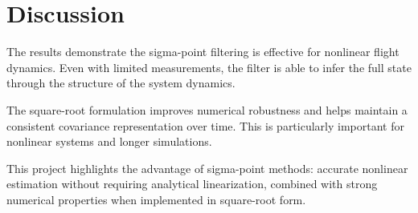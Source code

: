 \documentclass[11pt, letterpaper, twocolumn]{article}
\begin{document}
\pagebreak

\section*{Discussion}

The results demonstrate the sigma-point filtering is effective for nonlinear flight dynamics.
Even with limited measurements, the filter is able to infer the full state through the
structure of the system dynamics.

The square-root formulation improves numerical robustness and helps maintain a consistent
covariance representation over time. This is particularly important for nonlinear systems
and longer simulations.

This project highlights the advantage of sigma-point methods: accurate nonlinear estimation
without requiring analytical linearization, combined with strong numerical properties when
implemented in square-root form.
\end{document}
